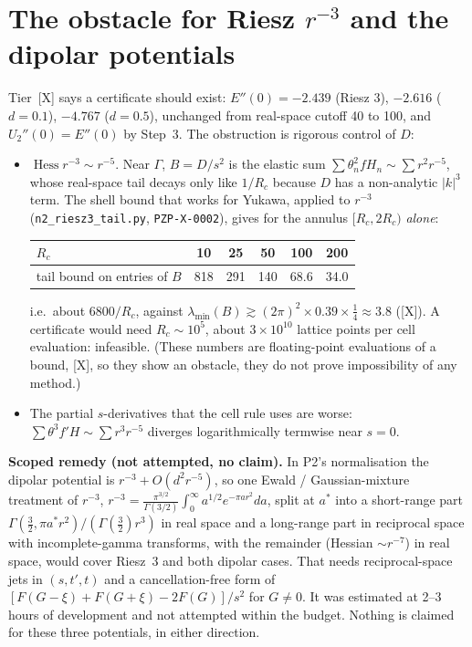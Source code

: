\documentclass[10pt]{article}
\newcommand{\tier}[1]{\textsf{[#1]}}
\newcommand{\tX}{\tier{X}}
\newcommand{\hess}{\operatorname{Hess}}
\begin{document}
\section{The obstacle for Riesz \texorpdfstring{$r^{-3}$}{1/r**3} and the dipolar potentials}\label{sec:obstacle}
Tier~\tX{} says a certificate should exist: $E''(0)=-2.439$ (Riesz 3), $-2.616$ ($d=0.1$), $-4.767$ ($d=0.5$), unchanged from real-space cutoff 40 to 100, and $U_2''(0)=E''(0)$ by Step~3. The obstruction is rigorous control of $D$:
\begin{itemize}\itemsep=1pt
\item $\hess r^{-3}\sim r^{-5}$. Near $\Gamma$, $B=D/s^2$ is the elastic sum $\sum\theta_n^2fH_n\sim\sum r^2r^{-5}$, whose real-space tail decays only like $1/R_c$ because $D$ has a non-analytic $|k|^3$ term. The shell bound that works for Yukawa, applied to $r^{-3}$ (\texttt{n2\_riesz3\_tail.py}, \texttt{PZP-X-0002}), gives for the annulus $[R_c,2R_c)$ \emph{alone}:
\begin{center}\small\begin{tabular}{lccccc}\toprule
$R_c$ & 10 & 25 & 50 & 100 & 200\\\midrule
tail bound on entries of $B$ & 818 & 291 & 140 & 68.6 & 34.0\\\bottomrule\end{tabular}\end{center}
i.e.\ about $6800/R_c$, against $\lambda_{\min}(B)\gtrsim(2\pi)^2\times0.39\times\tfrac14\approx3.8$ (\tX). A certificate would need $R_c\sim10^5$, about $3\times10^{10}$ lattice points per cell evaluation: infeasible. (These numbers are floating-point evaluations of a bound, \tX, so they show an obstacle, they do not prove impossibility of any method.)
\item The partial $s$-derivatives that the cell rule uses are worse: $\sum\theta^3f'H\sim\sum r^3r^{-5}$ diverges logarithmically termwise near $s=0$.
\end{itemize}
\textbf{Scoped remedy (not attempted, no claim).} In P2's normalisation the dipolar potential is $r^{-3}+O(d^2r^{-5})$, so one Ewald / Gaussian-mixture treatment of $r^{-3}$, $r^{-3}=\tfrac{\pi^{3/2}}{\Gamma(3/2)}\int_0^\infty a^{1/2}e^{-\pi ar^2}da$, split at $a^*$ into a short-range part $\Gamma(\tfrac32,\pi a^*r^2)/(\Gamma(\tfrac32)r^3)$ in real space and a long-range part in reciprocal space with incomplete-gamma transforms, with the remainder (Hessian $\sim r^{-7}$) in real space, would cover Riesz~3 and both dipolar cases. That needs reciprocal-space jets in $(s,t',t)$ and a cancellation-free form of $[F(G-\xi)+F(G+\xi)-2F(G)]/s^2$ for $G\ne0$. It was estimated at 2--3 hours of development and not attempted within the budget. Nothing is claimed for these three potentials, in either direction.
\end{document}
